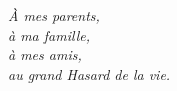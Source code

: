 \newpage
\thispagestyle{empty}  %

\vspace*{8cm}  %

\begin{flushright}  %
    \textit{À mes parents, \\ 
    à ma famille,\\
    à mes amis,\\ 
    au grand Hasard de la vie.}
\end{flushright}
